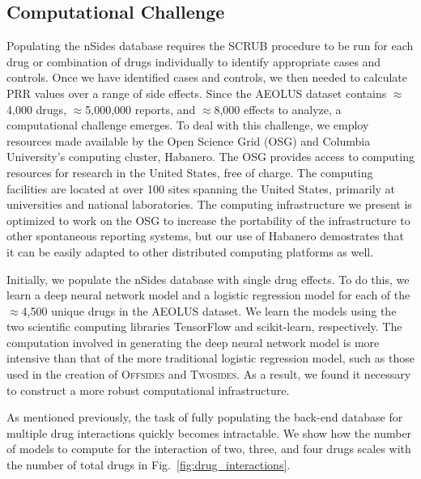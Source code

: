 \documentclass{ws-procs11x85}
\begin{document}
\subsection{Computational Challenge}

Populating the nSides database requires the SCRUB procedure to be run
for each drug or combination of drugs individually to identify
appropriate cases and controls. Once we have identified cases and
controls, we then needed to calculate PRR values over a range of side
effects. Since the AEOLUS dataset contains $\approx$4,000 drugs,
$\approx$5,000,000 reports, and $\approx$8,000 effects to analyze, a
computational challenge emerges.  To deal with this challenge, we
employ resources made available by the Open Science Grid (OSG) and
Columbia University's computing cluster, Habanero. The OSG provides
access to computing resources for research in the United States, free
of charge. The computing facilities are located at over 100 sites
spanning the United States, primarily at universities and national
laboratories. The computing infrastructure we present is optimized to
work on the OSG to increase the portability of the infrastructure to
other spontaneous reporting systems, but our use of Habanero
demostrates that it can be easily adapted to other distributed
computing platforms as well.

Initially, we populate the nSides database with single drug
effects. To do this, we learn a deep neural network model and a
logistic regression model for each of the $\approx$4,500 unique drugs
in the AEOLUS dataset. We learn the models using the two scientific
computing libraries TensorFlow and scikit-learn, respectively. The
computation involved in generating the deep neural network model is
more intensive than that of the more traditional logistic regression
model, such as those used in the creation of O\textsc{ffsides} and
T\textsc{wosides}. As a result, we found it necessary to construct a
more robust computational infrastructure.

As mentioned previously, the task of fully populating the back-end
database for multiple drug interactions quickly becomes
intractable. We show how the number of models to compute for the
interaction of two, three, and four drugs scales with the number of total
drugs in Fig.~\ref{fig:drug_interactions}.
\end{document}
